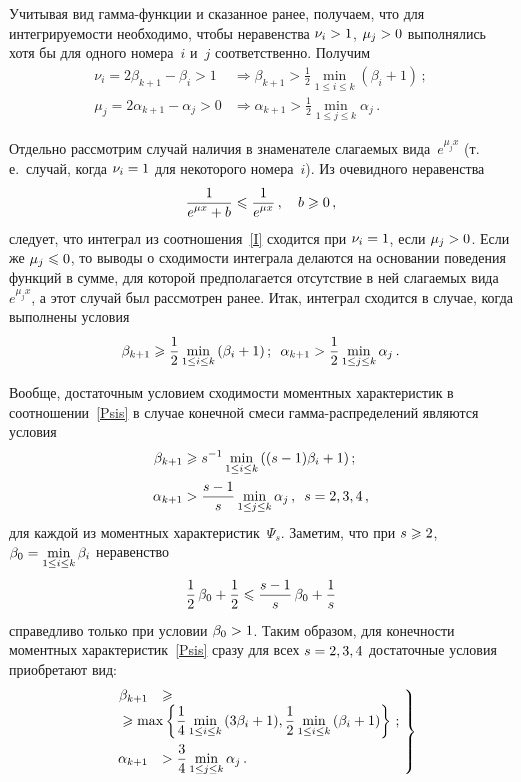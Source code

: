 \begin{multicols}{2}
Учитывая вид гамма-функ\-ции и сказанное ранее, получаем, что для
интегрируемости необходимо, чтобы неравенства $\nu_i\hm>1$, $\mu_j\hm>0$
выполнялись хотя бы для одного номера~$i$ и~$j$ соответственно.
Получим
\begin{align*}
\nu_i=2\beta_{k+1}-\beta_i>1&\Rightarrow\beta_{k+1}>\frac12\min\limits_{1\le
i\le k}
{(\beta_i+1)}\,;\\
\mu_j=2\alpha_{k+1}-\alpha_j>0&\Rightarrow\alpha_{k+1}>\frac12\min\limits_{1\le
j\le k}{\alpha_j}\,.
\end{align*}

Отдельно рассмотрим случай наличия  в знаменателе слагаемых вида~$e^{\mu_j x}$ 
(т.\,е.\ случай, когда $\nu_i\hm=1$ для некоторого номера~$i$). 
Из очевидного неравенства 
$$
\displaystyle\frac{\displaystyle 1\mathstrut}{\displaystyle e^{\mu x}+b\mathstrut}\leqslant\displaystyle\frac{\displaystyle 1\mathstrut}{\displaystyle e^{\mu x}\mathstrut}\,,\quad b\geqslant0\,,
$$ 
следует, что интеграл из соотношения~\eqref{I} сходится при $\nu_i\hm=1$, если $\mu_j\hm>0$. Если
же $\mu_j\hm\leqslant0$, то выводы о сходимости интеграла делаются на
основании поведения функций в сумме, для которой предполагается
отсутствие в ней слагаемых вида~$e^{\mu_j x}$, а этот случай был
рассмотрен ранее. Итак, интеграл сходится в случае, когда выполнены
условия
$$ %
\beta_{k+1}\geqslant\fr{1}{2}\min\limits_{1\le i\le
k}{(\beta_i+1)}\,;\enskip \alpha_{k+1}>\fr{1}{2}\min\limits_{1\le j\le k}{\alpha_j}\,.
$$

Вообще, достаточным условием сходимости моментных характеристик в
соотношении~\eqref{Psis} в случае конечной смеси гам\-ма-рас\-пре\-де\-ле\-ний
являются условия
\begin{align*}
\beta_{k+1}&\geqslant s^{-1}\min\limits_{1\le i\le
k}{((s-1)\beta_i+1)}\,;\\
\alpha_{k+1}&>\displaystyle\frac{\displaystyle s-1\mathstrut}{\displaystyle s\mathstrut}\min\limits_{1\le j\le k}{\alpha_j}\,,\enskip s=2,3,4\,,
\end{align*}
для каждой из моментных характеристик~$\Psi_s$. Заметим, что при
$s\hm\geqslant2$, $\beta_0\hm=\min\limits_{1\le i\le k}{\beta_i}$ неравенство
$$
\displaystyle\frac{\displaystyle 1\mathstrut}{\displaystyle 2\mathstrut}\,\beta_0+\displaystyle\frac{\displaystyle 1\mathstrut}{\displaystyle 2\mathstrut}\leqslant\displaystyle\frac{\displaystyle s-1\mathstrut}{\displaystyle s\mathstrut}\,\beta_0+\displaystyle\frac{\displaystyle 1\mathstrut}{\displaystyle s\mathstrut}
$$
справедливо только при условии $\beta_0\hm>1$. Таким образом, для
конечности моментных характеристик~\eqref{Psis} сразу для всех
$s\hm=2,3,4$ достаточные условия приобретают вид:
\begin{equation}
\left.
\begin{array}{rl}
\beta_{k+1}&\geqslant\\
&\!\!\!\!\!\!\!\!\!\!\!\!\!\!\!\!\!\geqslant\max\left\{\fr{1}{4}\min\limits_{1\le
i\le k}{(3\beta_i+1)},\fr{1}{2}\min\limits_{1\le i\le
k}{(\beta_i+1)}\right\}\,;\\[9pt]
\alpha_{k+1}&>\fr{3}{4}\min\limits_{1\le j\le
k}{\alpha_j}\,.
\end{array}\!
\right\}\!\!
\label{CondPsiGamma}
\end{equation}


\end{multicols}
